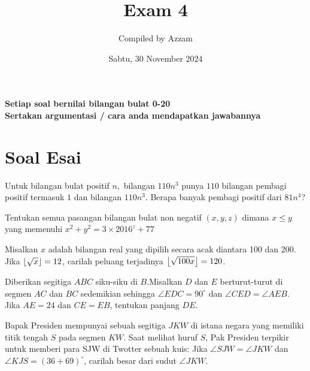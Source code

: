 \documentclass[11pt]{scrartcl}
\begin{document}
	\title{Exam 4} %
	\date{Sabtu, 30 November 2024}
	\author{Compiled by Azzam}
	\maketitle

\textbf{Setiap soal bernilai bilangan bulat 0-20}\\
\textbf{Sertakan argumentasi / cara anda mendapatkan jawabannya}
	
\section{Soal Esai} 
		\begin{soalbaru}
		Untuk bilangan bulat positif $n,$ bilangan $110n^3$ punya $110$ bilangan pembagi positif termasuk $1$ dan bilangan $110n^3.$ Berapa banyak pembagi positif dari $81n^4$?
		\end{soalbaru}
        
	\begin{soalbaru}
	Tentukan semua pasangan bilangan bulat non negatif $(x,y,z)$ dimana $x \le y$ yang memenuhi $x^2+y^2=3\times 2016^z+77$
	\end{soalbaru}

    	\begin{soalbaru}
	Misalkan $x$ adalah bilangan real yang dipilih secara acak diantara 100 dan 200. Jika $\left\lfloor \sqrt{x} \right\rfloor=12$, carilah peluang terjadinya $\left\lfloor \sqrt{100x} \right\rfloor=120$.
	\end{soalbaru}
	
	\begin{soalbaru}
	Diberikan segitiga $ABC$ siku-siku di $B$.Misalkan $D$ dan $E$ berturut-turut di segmen $AC$ dan $BC$ sedemikian sehingga $\angle EDC= 90^\circ$ dan $\angle CED = \angle AEB$. Jika $AE = 24$ dan $CE=EB$, tentukan panjang $DE$.
	\end{soalbaru}

    	\begin{soalbaru}
	Bapak Presiden mempunyai sebuah segitiga $JKW$ di istana negara yang memiliki titik tengah $S$ pada segmen $KW$. Saat melihat huruf $S$, Pak Presiden terpikir untuk memberi para SJW di Twotter sebuah kuis: Jika $\angle SJW = \angle JKW$ dan $\angle KJS = (36+69)^\circ$, carilah besar dari sudut $\angle JKW$.
	\end{soalbaru}
\end{document}
